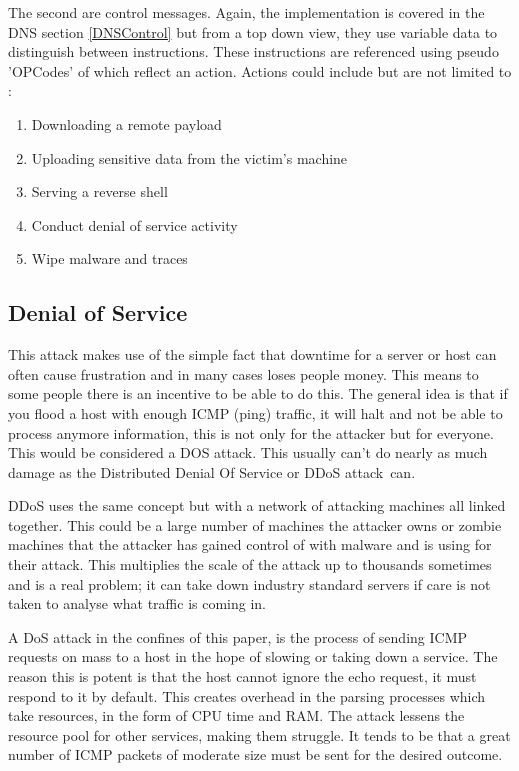 The second are control messages. Again, the implementation is covered in the DNS section \ref{DNSControl} but from a top down view, they use variable data to distinguish between instructions. These instructions are referenced using pseudo 'OPCodes' of which reflect an action. \cite{DNSTunneling}
Actions could include but are not limited to :
\begin{enumerate}
    \item Downloading a remote payload
    \item Uploading sensitive data from the victim's machine
    \item Serving a reverse shell
    \item Conduct denial of service activity
    \item Wipe malware and traces
\end{enumerate}


\subsection{Denial of Service}
This attack makes use of the simple fact that downtime for a server or host can often cause frustration and in many cases loses people money. This means to some people there is an incentive to be able to do this. The general idea is that if you flood a host with enough ICMP (ping) traffic, it will halt and not be able to process anymore information, this is not only for the attacker but for everyone. This would be considered a DOS attack. 
This usually can't do nearly as much damage as the Distributed Denial Of Service or DDoS attack can.

DDoS uses the same concept but with a network of attacking machines all linked together. This could be a large number of machines the attacker owns or zombie machines that the attacker has gained control of with malware and is using for their attack. This multiplies the scale of the attack up to thousands sometimes and is a real problem; it can take down industry 
standard servers if care is not taken to analyse what traffic is coming in.

A DoS attack in the confines of this paper, is the process of sending ICMP requests on mass to a host in the hope of slowing or taking down a service. The reason this is potent is that the host cannot ignore the echo request, it must respond to it by default. This creates overhead in the parsing processes which take resources, in the form of CPU time and RAM. The attack lessens the resource pool for other services, making them struggle. 
It tends to be that a great number of ICMP packets of moderate size must be sent for the desired outcome.

